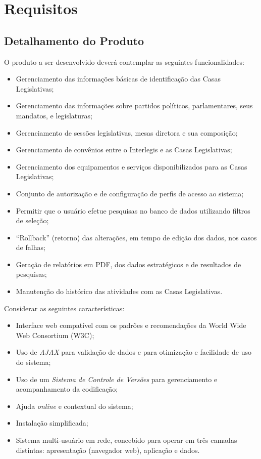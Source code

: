 %
%

\section{Requisitos}
\label{sec:requisitos}

\subsection{Detalhamento do Produto}
O produto a ser desenvolvido deverá contemplar as seguintes
funcionalidades:

\begin{itemize}
\item Gerenciamento das informações básicas de identificação das Casas
  Legislativas;
\item Gerenciamento das informações sobre partidos políticos,
  parlamentares, seus mandatos, e legislaturas;
\item Gerenciamento de sessões legislativas, mesas diretora e sua
  composição;
\item Gerenciamento de convênios entre o Interlegis e as Casas
  Legislativas;
\item Gerenciamento dos equipamentos e serviços disponibilizados para
  as Casas Legislativas;
\item Conjunto de autorização e de configuração de perfis de acesso ao
  sistema;
\item Permitir que o usuário efetue pesquisas no banco de dados
  utilizando filtros de seleção;
\item ``Rollback'' (retorno) das alterações, em tempo de
  edição dos dados, nos casos de falhas;
\item Geração de relatórios em PDF, dos dados estratégicos e
  de resultados de pesquisas;
\item Manutenção do histórico das atividades com as Casas Legislativas.
\end{itemize}

Considerar as seguintes características:

\begin{itemize}
\item Interface web compatível com os padrões e recomendações da World
  Wide Web Consortium (W3C);
\item Uso de \emph{AJAX} para validação de dados e para otimização e
  facilidade de uso do sistema;
\item Uso de um \emph{Sistema de Controle de Versões} para gerenciamento e
  acompanhamento da codificação;
\item Ajuda \textit{online} e contextual do sistema;
\item Instalação simplificada;
\item Sistema multi-usuário em rede, concebido para operar em três
  camadas distintas: apresentação (navegador web), aplicação e dados.
\end{itemize}

